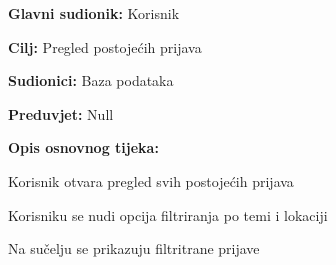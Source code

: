					\noindent {}
					\begin{packed_item}
	
						\item \textbf{Glavni sudionik: }Korisnik
						\item  \textbf{Cilj:} Pregled postojećih prijava
						\item  \textbf{Sudionici:} Baza podataka
						\item  \textbf{Preduvjet:} Null
						\item  \textbf{Opis osnovnog tijeka:}
						
						\item[] \begin{packed_enum}
	
							\item Korisnik otvara pregled svih postojećih prijava
							\item Korisniku se nudi opcija filtriranja po temi i lokaciji
							\item Na sučelju se prikazuju filtritrane prijave
						\end{packed_enum}
					\end{packed_item}
					
